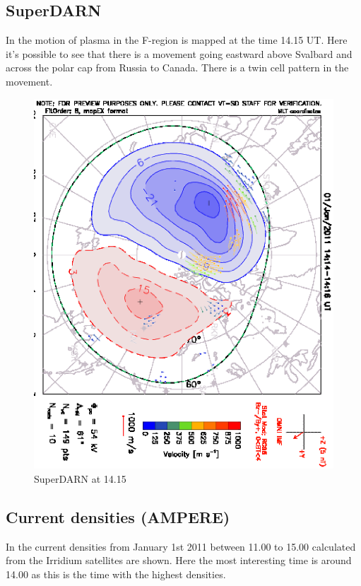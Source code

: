 \subsection{SuperDARN}

In  the motion of plasma in the F-region is mapped at the time 14.15 UT. Here it's possible to see that there is a movement going eastward above Svalbard and across the polar cap from Russia to Canada. There is a twin cell pattern in the movement. 

\begin{figure}[ht!]
\centering
\includegraphics[angle=90,width=\textwidth]{Figures/SD/pot_1415.eps}
\caption{SuperDARN at 14.15}
\label{fig:SD1415}
\end{figure}

\clearpage
\subsection{Current densities (AMPERE)}

In  the current densities from January 1st 2011 between 11.00 to 15.00  calculated from the Irridium satellites are shown. Here the most interesting time is around 14.00 as this is the time with the highest densities. 


